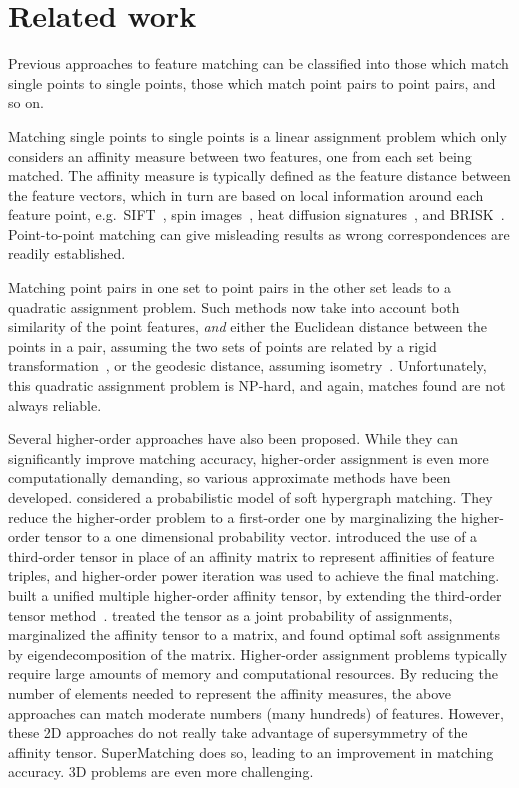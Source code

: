 \section{Related work}
\label{sec:related}

Previous approaches to feature matching can be classified into those which match single points to single points, those which match  point pairs to point pairs, and so on.

Matching single points to single points is a linear assignment problem which only considers an affinity measure between two features, one from each set being matched.
The affinity measure is typically defined as the feature distance between the feature vectors, which in turn are based on local information around each feature point,
e.g.\ SIFT~\cite{Lowe04}, spin images~\cite{Johnson99}, heat diffusion signatures~\cite{Sun09}, and BRISK~\cite{Leutenegger11}.
Point-to-point matching can give misleading results as wrong correspondences are readily established.

Matching point pairs  in one set to point pairs in the other set leads to a quadratic assignment problem.
Such methods now  take into account both similarity of the point features, \emph{and} either the Euclidean distance between the points in a pair,
assuming the two sets of points are related by a rigid transformation~\cite{Leordeanu05,Cour06}, or the geodesic distance, assuming isometry~\cite{li08,Tevs09,Ovsjanikov10,Tevs11,SahilliogluY11,Windheuser11}.
Unfortunately, this quadratic assignment problem is NP-hard, and again, matches found are not always reliable.

Several higher-order approaches have also been proposed.
While they can significantly improve matching accuracy,
higher-order assignment  is even more computationally demanding, so various approximate methods have been developed.
\cite{Zass08} considered a probabilistic model of soft hypergraph matching.
They reduce the higher-order problem to a first-order one by marginalizing the higher-order tensor to a one dimensional probability vector.
\cite{Duchenne09} introduced the use of a third-order tensor in place of an affinity matrix to represent affinities of feature triples,
and higher-order power iteration was used to achieve the final matching.
\cite{Aiping10} built a unified multiple higher-order affinity tensor, by extending the third-order tensor method~\cite{Duchenne09}.
\cite{Chertok10} treated the tensor as a joint probability of assignments, marginalized the affinity tensor to a matrix,
and found optimal soft assignments by eigendecomposition of the matrix.
Higher-order assignment problems typically require large amounts of memory and computational resources. By reducing the number of elements needed to represent the affinity measures, the above approaches can match moderate numbers (many hundreds) of features. However, these 2D approaches do not really take advantage of supersymmetry of the affinity tensor. SuperMatching does so, leading to an improvement in matching accuracy.
3D problems are even more challenging.

